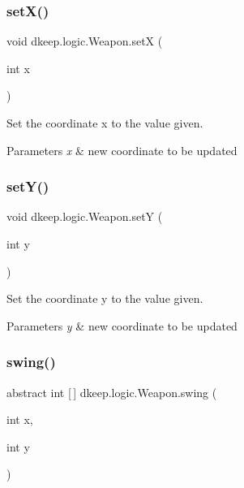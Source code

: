 \subsubsection{\texorpdfstring{set\+X()}{setX()}}
{\footnotesize\ttfamily void dkeep.\+logic.\+Weapon.\+setX (\begin{DoxyParamCaption}\item[{int}]{x }\end{DoxyParamCaption})}

Set the coordinate x to the value given. 
\begin{DoxyParams}{Parameters}
{\em x} & new coordinate to be updated \\
\hline
\end{DoxyParams}
\mbox{\label{classdkeep_1_1logic_1_1_weapon_a11572cdd07ba03705550964e1d076e9c}} 
\subsubsection{\texorpdfstring{set\+Y()}{setY()}}
{\footnotesize\ttfamily void dkeep.\+logic.\+Weapon.\+setY (\begin{DoxyParamCaption}\item[{int}]{y }\end{DoxyParamCaption})}

Set the coordinate y to the value given. 
\begin{DoxyParams}{Parameters}
{\em y} & new coordinate to be updated \\
\hline
\end{DoxyParams}
\mbox{\label{classdkeep_1_1logic_1_1_weapon_adb73dd1c376c37614cad2b5ad2e9d1d4}} 
\subsubsection{\texorpdfstring{swing()}{swing()}}
{\footnotesize\ttfamily abstract int \mbox{[}$\,$\mbox{]} dkeep.\+logic.\+Weapon.\+swing (\begin{DoxyParamCaption}\item[{int}]{x,  }\item[{int}]{y }\end{DoxyParamCaption})\hspace{0.3cm}{\ttfamily [abstract]}}

